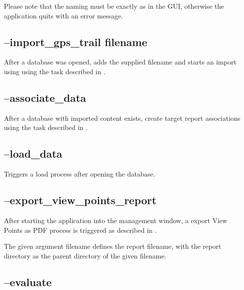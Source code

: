 Please note that the naming must be exactly as in the GUI, otherwise the application quits with an error message.


\subsection{--import\_gps\_trail filename}

After a database was opened, adds the supplied filename and starts an import using using the task described in .

% 
% 


\subsection{--associate\_data}

After a database with imported content exists, create target report associations using the task described in .

\subsection{--load\_data}

Triggers a load process after opening the database.

\subsection{--export\_view\_points\_report}

After starting the application into the management window, a export View Points as PDF process is triggered as described in
.

The given argument filename defines the report filename, with the report directory as the parent directory of the given filename.

\subsection{--evaluate}

